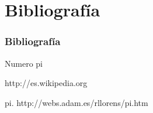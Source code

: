\documentclass{beamer}
\begin{document}

\section{Bibliografía}
\begin{frame}
  \frametitle{Bibliografía}

  \begin{thebibliography}{10}


    \beamertemplatebookbibitems
    \bibitem[numero pi]{}
    Numero pi
   
    {\small http://es.wikipedia.org}

    \beamertemplatebookbibitems
    pi. {\small http://webs.adam.es/rllorens/pi.htm }

  \end{thebibliography}
\end{frame}

\end{document}
